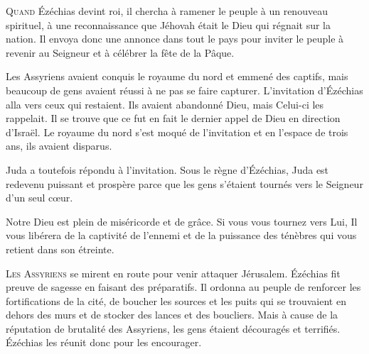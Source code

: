 \lettrine{Q}{uand} Ézéchias devint roi, il chercha à ramener le peuple
 à un renouveau spirituel, à une reconnaissance que Jéhovah était le Dieu
 qui régnait sur la nation.
 Il envoya donc une annonce dans tout le pays pour inviter le peuple
 à revenir au Seigneur et à célébrer la fête de la Pâque.

Les Assyriens avaient conquis le royaume du nord et emmené des captifs,
 mais beaucoup de gens avaient réussi à ne pas se faire capturer.
 L'invitation d'Ézéchias alla vers ceux qui restaient.
 Ils avaient abandonné Dieu, mais Celui-ci les rappelait.
 Il se trouve que ce fut en fait le dernier appel de Dieu en direction d'Israël.
 Le royaume du nord s'est moqué de l'invitation et en l'espace de trois ans,
 ils avaient disparus. 


Juda a toutefois répondu à l'invitation. Sous le règne d'Ézéchias,
 Juda est redevenu puissant et prospère parce que les gens s'étaient
 tournés vers le Seigneur d'un seul c\oe{}ur.

Notre Dieu est plein de miséricorde et de grâce.
 Si vous vous tournez vers Lui, Il vous libérera de la captivité
 de l'ennemi et de la puissance des ténèbres qui vous retient
 dans son étreinte. 

\dvrule









\lettrine{L}{es Assyriens} se mirent en route pour venir attaquer Jérusalem.
 Ézéchias fit preuve de sagesse en faisant des préparatifs.
 Il ordonna au peuple de renforcer les fortifications de la cité,
 de boucher les sources et les puits qui se trouvaient en dehors des murs
 et de stocker des lances et des boucliers.
 Mais à cause de la réputation de brutalité des Assyriens,
 les gens étaient découragés et terrifiés.
 Ézéchias les réunit donc pour les encourager.

